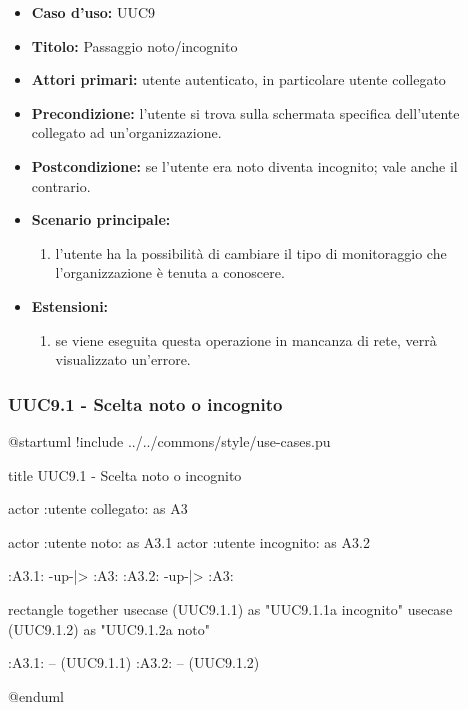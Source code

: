 \documentclass[casi-duso]{subfiles}
\begin{document}
\begin{itemize}
  \item \textbf{Caso d’uso:} UUC9
  \item \textbf{Titolo:} Passaggio noto/incognito
  \item \textbf{Attori primari:} utente autenticato, in particolare utente collegato
  \item \textbf{Precondizione:} l'utente si trova sulla schermata specifica dell'utente collegato ad un'organizzazione.
  \item \textbf{Postcondizione:} se l'utente era noto diventa incognito; vale anche il contrario.
  \item \textbf{Scenario principale:}
        \begin{enumerate}
          \item l'utente ha la possibilità di cambiare il tipo di monitoraggio che l'organizzazione è tenuta a conoscere.
        \end{enumerate}
  \item \textbf{Estensioni:}
        \begin{enumerate}
          \item se viene eseguita questa operazione in mancanza di rete, verrà visualizzato un'errore.
        \end{enumerate}
\end{itemize}

\subsubsection{UUC9.1 - Scelta noto o incognito}%
\label{subsub:UUC9.1utente}

\begin{plantuml}
@startuml
!include ../../commons/style/use-cases.pu

title UUC9.1 - Scelta noto o incognito

actor :utente collegato: as A3

actor :utente noto: as A3.1
actor :utente incognito: as A3.2

:A3.1: -up-|> :A3:
:A3.2: -up-|> :A3:

rectangle {
  together {
    usecase (UUC9.1.1) as "UUC9.1.1\nPassaggio a incognito"
    usecase (UUC9.1.2) as "UUC9.1.2\nPassaggio a noto"
  }
}

:A3.1: -- (UUC9.1.1)
:A3.2: -- (UUC9.1.2)

@enduml
\end{plantuml}
\end{document}

